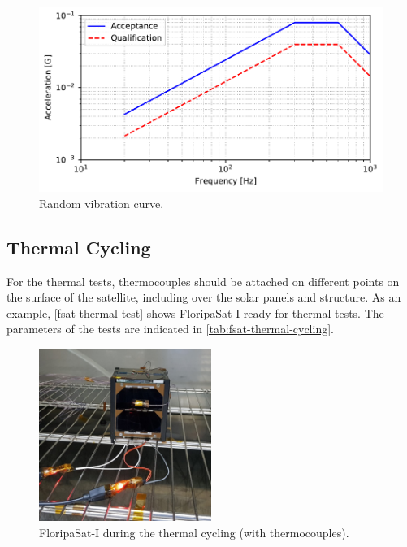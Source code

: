 \begin{figure}[!ht]
    \begin{center}
        \includegraphics[width=\textwidth]{curves/random_vibration.pdf}
        \caption{Random vibration curve.}
        \label{fig:vibration-test}
    \end{center}
\end{figure}

\subsection{Thermal Cycling}

For the thermal tests, thermocouples should be attached on different points on the surface of the satellite, including over the solar panels and structure. As an example, \autoref{fsat-thermal-test} shows FloripaSat-I ready for thermal tests. The parameters of the tests are indicated in \autoref{tab:fsat-thermal-cycling}.

\begin{figure}[!ht]
    \begin{center}
        \includegraphics[width=0.5\textwidth]{figures/fsat_fm_thermal_cycling.jpg}
        \caption{FloripaSat-I during the thermal cycling (with thermocouples).}
        \label{fig:fsat-thermal-test}
    \end{center}
\end{figure}

